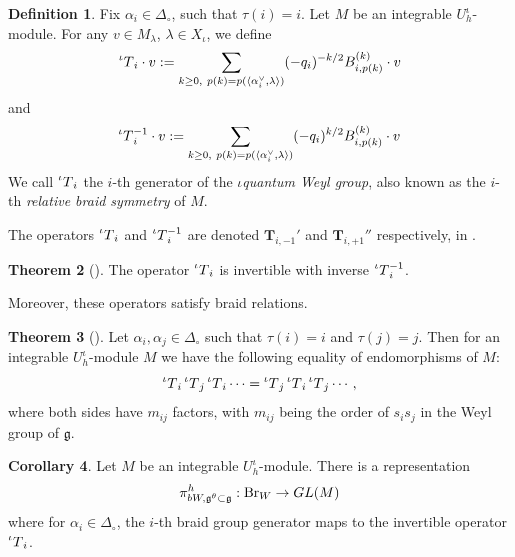 \documentclass[10pt]{amsart}
\numberwithin{equation}{section}
\theoremstyle{definition}
\newtheorem{theorem}{Theorem}[section]
\newtheorem{corollary}[theorem]{Corollary}
\newtheorem{definition}[theorem]{Definition}
\newcommand{\iQW}{\prescript{\iota}{}{T}}
\newcommand{\g}{\mathfrak{g}}
\begin{document}
    \begin{definition}\label{def:iQW}
        Fix $\alpha_i\in \Delta_{\circ}$, such that $\tau(i) = i$. Let $M$ be an integrable $U_h^\iota$-module. For any $v\in M_{\lambda}$, $\lambda\in X_\iota$, we define
        \begin{equation}\label{iQ_symm}
            \iQW_i\cdot v:=\sum_{k\ge 0, \  p(k)=p(\langle \alpha_i^{\vee},\lambda \rangle)} (-q_i)^{-k/2} B_{i,p(k)}^{(k)}\cdot v
        \end{equation}
        and
        \begin{equation}\label{iQ_symm_inverse}
            \iQW_i^{-1}\cdot v:=\sum_{k\ge 0, \  p(k)=p(\langle \alpha_i^{\vee},\lambda \rangle)} (-q_i)^{k/2} B_{i,p(k)}^{(k)}\cdot v
        \end{equation}
        We call $\iQW_i$ the $i$-th generator of the \emph{$\iota$quantum Weyl group}, also known as the $i$-th \emph{relative braid symmetry} of $M$. 
    \end{definition}

The operators $\iQW_i$ and $\iQW_i^{-1}$ are denoted $\textbf{T}_{i,-1}'$ and $\textbf{T}_{i,+1}''$ respectively, in \cite{WW25}.

    \begin{theorem}[{\cite[Corollary 3.10]{WW25}}]
    The operator $\iQW_i$ is invertible with inverse $\iQW_i^{-1}$. 
    \end{theorem} 

Moreover, these operators satisfy braid relations.

    \begin{theorem}[{\cite[Theorem E]{WW25}}]
        Let $\alpha_i, \alpha_j\in \Delta_{\circ}$ such that $\tau(i) = i$ and $\tau(j) = j$. Then for an integrable $U_{h}^{\iota}$-module $M$ we have the following equality of endomorphisms of $M$:
        \[
        \iQW_i\iQW_j\iQW_i\cdots = \iQW_j\iQW_i\iQW_j\cdots,
        \]
        where both sides have $m_{ij}$ factors, with $m_{ij}$ being the order of $s_{i}s_{j}$ in the Weyl group of $\mathfrak{g}$.
    \end{theorem}

    \begin{corollary}\label{cor:iqwbraidrep}
        Let $M$ be an integrable $U_{h}^{\iota}$-module. There is a representation
        \[
        \pi_{bW, \g^{\theta}\subset \g}^{h}:{\rm Br}_{W}\rightarrow GL(M)
        \]
        where for $\alpha_i\in \Delta_{\circ}$, the $i$-th braid group generator maps to the invertible operator $\iQW_i$.
    \end{corollary}
\end{document}

